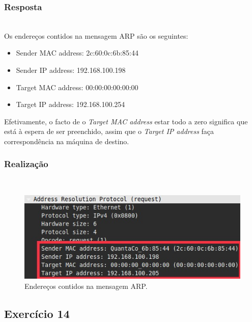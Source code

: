 \documentclass{llncs}
\begin{document}
\subsubsection{Resposta}\rule[-10pt]{0pt}{10pt}\\

Os endereços contidos na mensagem ARP são os seguintes:

\begin{itemize}
	\item Sender MAC address: 2c:60:0c:6b:85:44

	\item Sender IP address: 192.168.100.198

	\item Target MAC address: 00:00:00:00:00:00 

	\item Target IP address: 192.168.100.254
\end{itemize}

Efetivamente, o facto de o \textit{Target MAC address} estar todo a zero significa que está à espera de ser preenchido, assim que o \textit{Target IP address} faça correspondência na máquina de destino.

\subsubsection{Realização}\rule[-10pt]{0pt}{10pt}\\

\begin{figure}
  \begin{center}
	  \includegraphics[scale=0.6]{./imagens/arp_request_addr.png} 
  \end{center}
	\caption{Endereços contidos na mensagem ARP.}
  \label{fig:arp_request_addr}
\end{figure} 


\clearpage
\subsection{Exercício 14}
\end{document}
